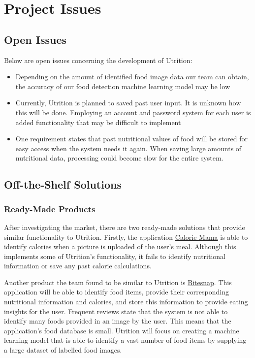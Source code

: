 \documentclass[12pt]{article}
\begin{document}
\section{Project Issues}

\subsection{Open Issues}
Below are open issues concerning the development of Utrition:
\begin{itemize}
	\item Depending on the amount of identified food image data our team can obtain, the accuracy of our food detection machine learning model may be low
	\item Currently, Utrition is planned to saved past user input. It is unknown how this will be done. Employing an account and password system for each user is added functionality that may be difficult to implement 
	\item One requirement states that past nutritional values of food will be stored for easy access when the system needs it again. When saving large amounts of nutritional data, processing could become slow for the entire system.
\end{itemize}

\subsection{Off-the-Shelf Solutions}
\subsubsection{Ready-Made Products}
After investigating the market, there are two ready-made solutions that provide similar functionality to Utrition. Firstly, the application \href{https://www.caloriemama.ai/#Categories}{Calorie Mama} is able to identify calories when a picture is uploaded of the user's meal. Although this implements some of Utrition's functionality, it fails to identify nutritional information or save any past calorie calculations.

Another product the team found to be similar to Utrition is \href{https://play.google.com/store/apps/details?id=ai.bite.biteapp&hl=en_US&gl=US}{Bitesnap}. This application will be able to identify food items, provide their corresponding nutritional information and calories, and store this information to provide eating insights for the user. Frequent reviews state that the system is not able to identify many foods provided in an image by the user. This means that the application's food database is small. Utrition will focus on creating a machine learning model that is able to identify a vast number of food items by supplying a large dataset of labelled food images. 
\end{document}
